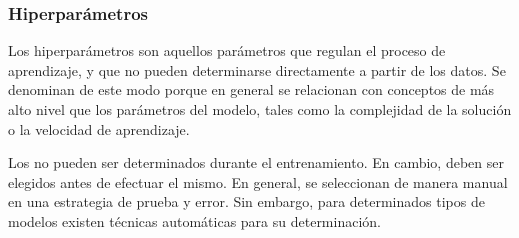 %
\subsubsection{Hiperparámetros}
%
Los hiperparámetros son aquellos parámetros que regulan el proceso de
aprendizaje, y que no pueden determinarse directamente a partir de
los datos. Se denominan de este modo porque en general se relacionan
con conceptos de más alto nivel que los parámetros del modelo, tales
como la complejidad de la solución o la velocidad de aprendizaje.

Los  no pueden ser determinados durante el entrenamiento.
En cambio, deben ser elegidos antes de efectuar el mismo.
En general, se seleccionan de manera manual en una estrategia de
prueba y error. Sin embargo, para determinados tipos de modelos
existen técnicas automáticas para su determinación.
